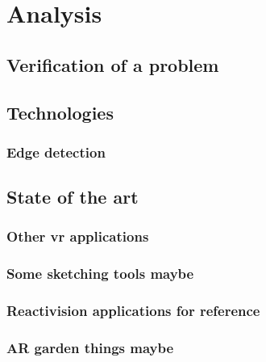 \chapter{Analysis}
	
	
	\section{Verification of a problem}\label{sec:verification}
	\section{Technologies}\label{sec:technologies}
		\subsection{Edge detection}
		 

    \section{State of the art}\label{sec:SOTA}
		\subsection{Other vr applications}
		\subsection{Some sketching tools maybe}
		\subsection{Reactivision applications for reference}
		\subsection{AR garden things maybe}